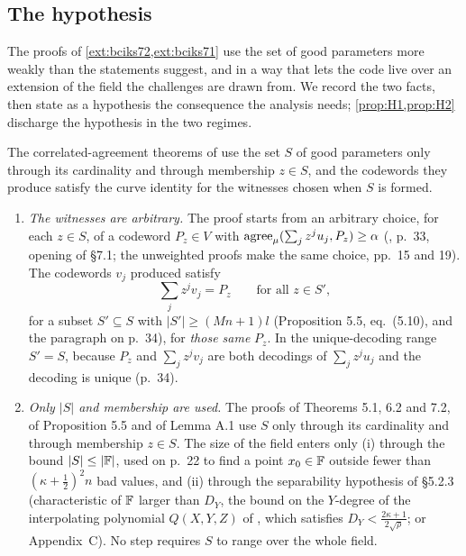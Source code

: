 \subsection{The hypothesis}\label{sec:params}

The proofs of \cref{ext:bciks72,ext:bciks71} use the set of good parameters more weakly than the
statements suggest, and in a way that lets the code live over an extension of the field the
challenges are drawn from. We record the two facts, then state as a hypothesis the consequence the
analysis needs; \cref{prop:H1,prop:H2} discharge the hypothesis in the two regimes.

\begin{remark}\label{ext:proof-facts}
The correlated-agreement theorems of \cite{BCIKS20} use the set $S$ of good parameters only
through its cardinality and through membership $z\in S$, and the codewords they produce satisfy
the curve identity for the witnesses chosen when $S$ is formed.
\begin{enumerate}
\item[(F1)] \emph{The witnesses are arbitrary.} The proof starts from an arbitrary choice, for
each $z\in S$, of a codeword $P_z\in V$ with $\mathrm{agree}_\mu(\sum_jz^ju_j,P_z)\ge\alpha$
(\cite{BCIKS20}, p.~33, opening of \S7.1; the unweighted proofs make the same choice, pp.~15 and
19). The codewords $v_j$ produced satisfy
\[
\textstyle\sum_{j}z^jv_j=P_z\qquad\text{for all }z\in S',
\]
for a subset $S'\subseteq S$ with $|S'|\ge(Mn+1)l$ (Proposition 5.5, eq.~(5.10), and the
paragraph on p.~34), for \emph{those same} $P_z$. In the unique-decoding range $S'=S$, because
$P_z$ and $\sum_jz^jv_j$ are both decodings of $\sum_jz^ju_j$ and the decoding is unique (p.~34).
\item[(F2)] \emph{Only $|S|$ and membership are used.} The proofs of Theorems 5.1, 6.2 and 7.2, of
Proposition 5.5 and of Lemma A.1 use $S$ only through its cardinality and through membership
$z\in S$. The size of the field enters only (i) through the bound $|S|\le|\mathbb{F}|$, used on p.~22 to
find a point $x_0\in\mathbb{F}$ outside fewer than $(\kappa+\frac12)^2n$ bad values, and (ii) through the
separability hypothesis of \S5.2.3 (characteristic of $\mathbb{F}$ larger than $D_Y$, the bound on the
$Y$-degree of the interpolating polynomial $Q(X,Y,Z)$ of \cite[\S5]{BCIKS20}, which satisfies
$D_Y<\frac{2\kappa+1}{2\sqrt\rho}$; or Appendix~C). No step
requires $S$ to range over the whole field.
\end{enumerate}
\end{remark}

